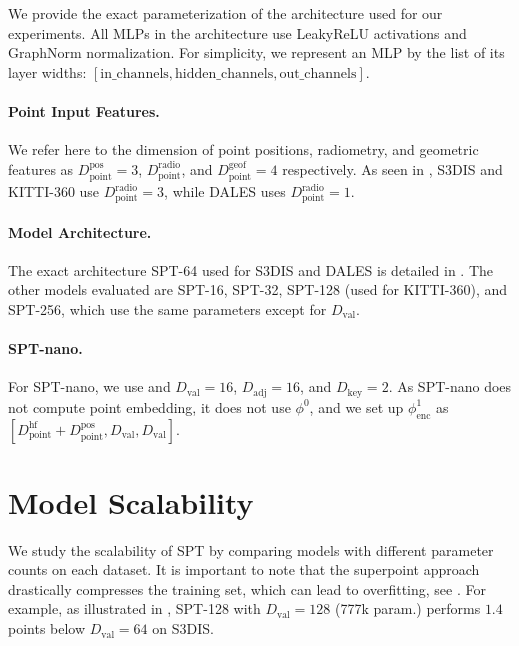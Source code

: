 We provide the exact parameterization of the \SHORTHAND architecture used for our experiments.   
All MLPs in the architecture use LeakyReLU activations and GraphNorm \cite{cai2021graphnorm} normalization. For simplicity, we represent an MLP by the list of its layer widths: $[\text{in\_channels}, \text{hidden\_channels}, \text{out\_channels}]$. 

\paragraph{Point Input Features.} {
We refer here to the dimension of point positions, radiometry, and geometric features as $D_\text{point}^{\text{pos}}=3$, $D_\text{point}^{\text{radio}}$, and $D_\text{point}^{\text{geof}}=4$ respectively. 
As seen in , S3DIS and KITTI-360 use $D_\text{point}^{\text{radio}}=3$, while DALES uses $D_\text{point}^{\text{radio}}=1$.
}

\paragraph{Model Architecture.}{
The exact architecture SPT-64 used for S3DIS and DALES is detailed in .
The other models evaluated are SPT-16, SPT-32, SPT-128 (used for KITTI-360), and SPT-256, which use the same parameters except for $D_\text{val}$. 

\paragraph{SPT-nano.} For SPT-nano, we use and $D_\text{val}=16$, $D_\text{adj}=16$, and $D_\text{key}=2$. As SPT-nano does not compute point embedding, it does not use $\phi^0$, and we set up $\phi^1_\text{enc}$ as $[D_\text{point}^{\text{hf}} + D_\text{point}^{\text{pos}}, D_\text{val}, D_\text{val}]$.
}

\section{Model Scalability}
\label{sec:scalingablation}

We study the scalability of SPT by comparing models with different parameter counts on each dataset. 
It is important to note that the superpoint approach drastically compresses the training set, which can lead to overfitting, see . 
For example, as illustrated in , SPT-128 with $D_\text{val}={128}$ (777k param.) performs $1.4$ points below $D_\text{val}=64$ on S3DIS. 

